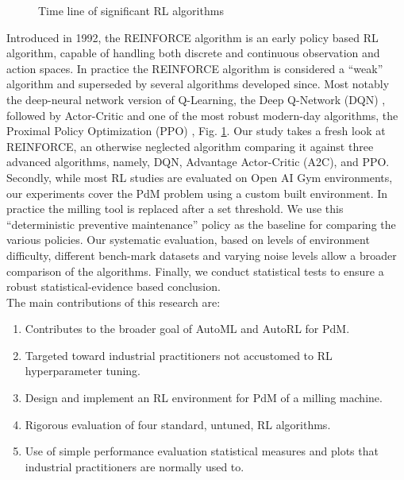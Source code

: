 \documentclass[referee, sn-mathphys-num]{sn-jnl}
\begin{document}
	\begin{figure}[hbt!]	
		\startchronology[startyear=1940, startdate=false, stopdate=false, arrow=false, color=codegray, height=.5ex]
		\stopchronology
		\vspace{-36pt}
		\caption{Time line of significant RL algorithms}
		\label{fig_TimeLine}
	\end{figure}
	Introduced in 1992, the REINFORCE algorithm \cite{REINFORCE-williams1992} is an early policy based RL algorithm, capable of handling both discrete and continuous observation and action spaces. In practice the REINFORCE algorithm is considered a ``weak'' algorithm and superseded by several algorithms developed since. Most notably the deep-neural network version of Q-Learning, the Deep Q-Network (DQN) \cite{DQN-mnih2013}, followed by Actor-Critic \cite{A2C-mnih2016} and one of the most robust modern-day algorithms, the Proximal Policy Optimization (PPO) \cite{PPO-schulman2017}, Fig. \ref{fig_TimeLine}. Our study takes a fresh look at REINFORCE, an otherwise neglected algorithm comparing it against three advanced algorithms, namely, DQN, Advantage Actor-Critic (A2C), and PPO. Secondly, while most RL studies are evaluated on Open AI Gym environments, our experiments cover the PdM problem using a custom built environment. In practice the milling tool is replaced after a set threshold. We use this ``deterministic preventive maintenance'' policy as the baseline for comparing the various policies. Our systematic evaluation, based on levels of environment difficulty, different bench-mark datasets and varying noise levels allow a broader comparison of the algorithms. Finally, we conduct statistical tests to ensure a robust statistical-evidence based conclusion.\\
	
	The main contributions of this research are:
	\begin{enumerate}
		\item Contributes to the broader goal of AutoML and AutoRL for PdM.
		\item Targeted toward industrial practitioners not accustomed to RL hyperparameter tuning.
		\item Design and implement an RL environment for PdM of a milling machine.
		\item Rigorous evaluation of four standard, untuned, RL algorithms.
		\item Use of simple performance evaluation statistical measures and plots that industrial practitioners are normally used to.
	\end{enumerate} 
	
\end{document}

